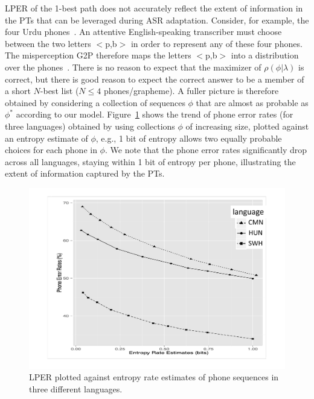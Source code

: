 
LPER of the 1-best path does not
accurately reflect the extent of information in the PTs that can be
leveraged during ASR adaptation.  Consider, for example, the four
Urdu phones~\ipa{[p,p\textsuperscript{h},b,\"*b]}.  An attentive
English-speaking transcriber must choose between the two letters
$<$p,b$>$ in order to represent any of these four phones.  The
misperception G2P therefore maps the letters $<$p,b$>$ into a
distribution over the phones~\ipa{[p,p\textsuperscript{h},b,\"*b]}.
There is no reason to expect that the maximizer of
$\rho(\phi|\lambda)$ is correct, but there is good reason to expect
the correct answer to be a member of a short $N$-best list ($N\le 4$
phones/grapheme).  A fuller picture is therefore obtained by
considering a collection of sequences $\phi$ that are almost as
probable as $\phi^*$ according to our model. Figure~\ref{fig:listPER}
shows the trend of phone error rates (for three languages) obtained by
using collections $\phi$ of increasing size, plotted against an
entropy estimate of $\phi$, e.g., 1 bit of entropy allows two equally
probable choices for each phone in $\phi$. We note that the phone
error rates significantly drop across all languages, staying within 1
bit of entropy per phone, illustrating the extent of information
captured by the PTs.

\begin{figure}[t!]
  \centerline{\includegraphics[width=0.7\columnwidth]{../figs/ptperfigure.pdf}}
  \vspace*{-0.5cm}
  \caption{LPER plotted against entropy rate estimates of phone sequences in three different languages.}
\label{fig:listPER}
\end{figure}


